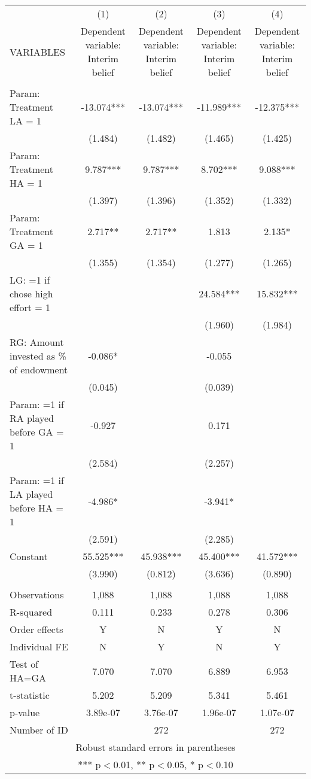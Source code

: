 \documentclass[]{article}
\begin{document}
\begin{tabular}{lcccc} \hline
 & (1) & (2) & (3) & (4) \\
VARIABLES & Dependent variable: Interim belief & Dependent variable: Interim belief & Dependent variable: Interim belief & Dependent variable: Interim belief \\ \hline
 &  &  &  &  \\
Param: Treatment LA = 1 & -13.074*** & -13.074*** & -11.989*** & -12.375*** \\
 & (1.484) & (1.482) & (1.465) & (1.425) \\
Param: Treatment HA = 1 & 9.787*** & 9.787*** & 8.702*** & 9.088*** \\
 & (1.397) & (1.396) & (1.352) & (1.332) \\
Param: Treatment GA = 1 & 2.717** & 2.717** & 1.813 & 2.135* \\
 & (1.355) & (1.354) & (1.277) & (1.265) \\
LG: =1 if chose high effort = 1 &  &  & 24.584*** & 15.832*** \\
 &  &  & (1.960) & (1.984) \\
RG: Amount invested as \% of endowment & -0.086* &  & -0.055 &  \\
 & (0.045) &  & (0.039) &  \\
Param: =1 if RA played before GA = 1 & -0.927 &  & 0.171 &  \\
 & (2.584) &  & (2.257) &  \\
Param: =1 if LA played before HA = 1 & -4.986* &  & -3.941* &  \\
 & (2.591) &  & (2.285) &  \\
Constant & 55.525*** & 45.938*** & 45.400*** & 41.572*** \\
 & (3.990) & (0.812) & (3.636) & (0.890) \\
 &  &  &  &  \\
Observations & 1,088 & 1,088 & 1,088 & 1,088 \\
R-squared & 0.111 & 0.233 & 0.278 & 0.306 \\
Order effects & Y & N & Y & N \\
Individual FE & N & Y & N & Y \\
Test of HA=GA & 7.070 & 7.070 & 6.889 & 6.953 \\
t-statistic & 5.202 & 5.209 & 5.341 & 5.461 \\
p-value & 3.89e-07 & 3.76e-07 & 1.96e-07 & 1.07e-07 \\
 Number of ID &  & 272 &  & 272 \\ \hline
\multicolumn{5}{c}{ Robust standard errors in parentheses} \\
\multicolumn{5}{c}{ *** p$<$0.01, ** p$<$0.05, * p$<$0.10} \\
\end{tabular}
\end{document}
